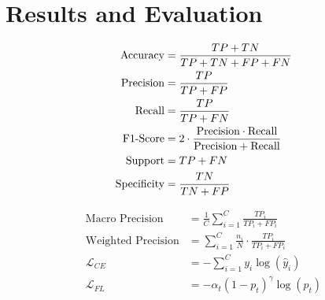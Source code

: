 \section{Results and Evaluation}


\begin{center}
	\begin{minipage}[t]{0.48\textwidth}
		\begin{align}
			\text{Accuracy} &= \frac{TP + TN}{TP + TN + FP + FN} \\
			\text{Precision} &= \frac{TP}{TP + FP} \\
			\text{Recall} &= \frac{TP}{TP + FN} \\
			\text{F1\text{-}Score} &= 2 \cdot \frac{\text{Precision} \cdot \text{Recall}}{\text{Precision} + \text{Recall}} \\
			\text{Support} &= TP + FN \\
			\text{Specificity} &= \frac{TN}{TN + FP}
		\end{align}
	\end{minipage}
	\hfill	
	\begin{minipage}[t]{0.48\textwidth}
		\begin{align}
			\text{Macro Precision} &= \frac{1}{C} \sum_{i=1}^{C} \frac{TP_i}{TP_i + FP_i} \\
			\text{Weighted Precision} &= \sum_{i=1}^{C} \frac{n_i}{N} \cdot \frac{TP_i}{TP_i + FP_i} \\
			\mathcal{L}_{CE} &= -\sum_{i=1}^{C} y_i \log(\hat{y}_i) \\
			\mathcal{L}_{FL} &= -\alpha_t (1 - p_t)^\gamma \log(p_t)
		\end{align}
	\end{minipage}
\end{center}
